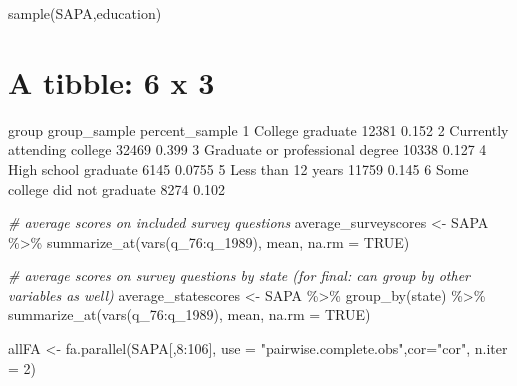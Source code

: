 \documentclass[
]{article}
\newenvironment{Shaded}{\begin{snugshade}}{\end{snugshade}}
\newcommand{\AttributeTok}[1]{\textcolor[rgb]{0.77,0.63,0.00}{#1}}
\newcommand{\CommentTok}[1]{\textcolor[rgb]{0.56,0.35,0.01}{\textit{#1}}}
\newcommand{\ConstantTok}[1]{\textcolor[rgb]{0.00,0.00,0.00}{#1}}
\newcommand{\DecValTok}[1]{\textcolor[rgb]{0.00,0.00,0.81}{#1}}
\newcommand{\FunctionTok}[1]{\textcolor[rgb]{0.00,0.00,0.00}{#1}}
\newcommand{\NormalTok}[1]{#1}
\newcommand{\OtherTok}[1]{\textcolor[rgb]{0.56,0.35,0.01}{#1}}
\newcommand{\SpecialCharTok}[1]{\textcolor[rgb]{0.00,0.00,0.00}{#1}}
\newcommand{\StringTok}[1]{\textcolor[rgb]{0.31,0.60,0.02}{#1}}
\begin{document}
\begin{Shaded}
\begin{Highlighting}[]
\FunctionTok{sample}\NormalTok{(SAPA,education)}
\end{Highlighting}
\end{Shaded}

\hypertarget{a-tibble-6-x-3-1}{%
\section{A tibble: 6 x 3}\label{a-tibble-6-x-3-1}}

group group\_sample percent\_sample
1 College graduate 12381 0.152
2 Currently attending college 32469 0.399
3 Graduate or professional degree 10338 0.127
4 High school graduate 6145 0.0755
5 Less than 12 years 11759 0.145
6 Some college did not graduate 8274 0.102

\begin{Shaded}
\begin{Highlighting}[]
\CommentTok{\# average scores on included survey questions}
\NormalTok{average\_surveyscores }\OtherTok{\textless{}{-}}\NormalTok{ SAPA }\SpecialCharTok{\%\textgreater{}\%}
  \FunctionTok{summarize\_at}\NormalTok{(}\FunctionTok{vars}\NormalTok{(q\_76}\SpecialCharTok{:}\NormalTok{q\_1989), mean, }\AttributeTok{na.rm =} \ConstantTok{TRUE}\NormalTok{)}

\CommentTok{\# average scores on survey questions by state (for final: can group by other variables as well)}
\NormalTok{average\_statescores }\OtherTok{\textless{}{-}}\NormalTok{ SAPA }\SpecialCharTok{\%\textgreater{}\%}
  \FunctionTok{group\_by}\NormalTok{(state) }\SpecialCharTok{\%\textgreater{}\%}
  \FunctionTok{summarize\_at}\NormalTok{(}\FunctionTok{vars}\NormalTok{(q\_76}\SpecialCharTok{:}\NormalTok{q\_1989), mean, }\AttributeTok{na.rm =} \ConstantTok{TRUE}\NormalTok{)}
\end{Highlighting}
\end{Shaded}

\begin{Shaded}
\begin{Highlighting}[]
\NormalTok{allFA }\OtherTok{\textless{}{-}} \FunctionTok{fa.parallel}\NormalTok{(SAPA[,}\DecValTok{8}\SpecialCharTok{:}\DecValTok{106}\NormalTok{], }\AttributeTok{use =} \StringTok{"pairwise.complete.obs"}\NormalTok{,}\AttributeTok{cor=}\StringTok{"cor"}\NormalTok{, }\AttributeTok{n.iter =} \DecValTok{2}\NormalTok{)}
\end{Highlighting}
\end{Shaded}
\end{document}
